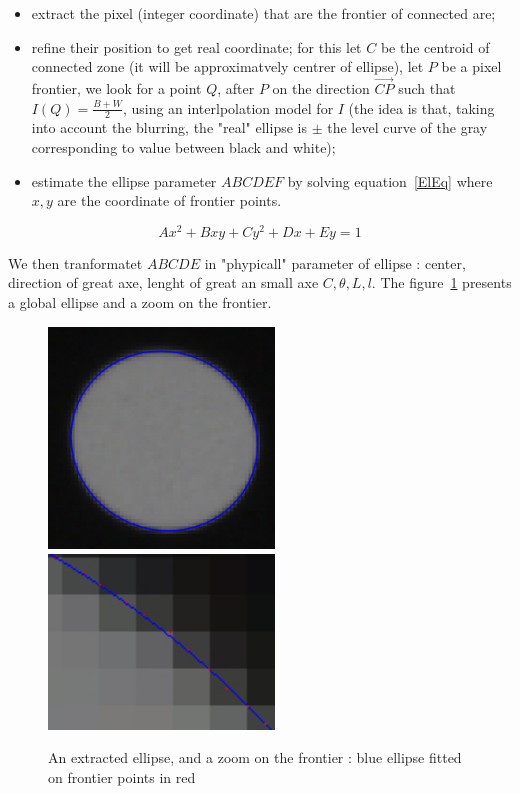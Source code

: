 \begin{itemize}
	\item  extract the pixel (integer coordinate) that are the frontier of
		connected are;

	\item  refine their position to get real coordinate;  for this let $C$ be the
		centroid of connected zone (it will be approximatvely centrer of ellipse), let
		$P$ be a pixel frontier, we look for a point $Q$, after $P$
		on the direction $\overrightarrow{CP}$  such that $I(Q) = \frac{B+W}{2}$,
		using an interlpolation model for $I$ (the idea  is that, taking into account
		the blurring, the "real" ellipse is  $\pm$ the level
		curve of the gray corresponding to value between black and white);

	\item  estimate the ellipse parameter $ABCDEF$ by solving equation~\ref{ElEq}
		where $x,y$ are the coordinate of frontier points.
\end{itemize}

\begin{equation}
	A x^2 + B xy + C y^2 + Dx + E y = 1 \label{ElEq}
\end{equation}


We then tranformatet $ABCDE$ in "phypicall" parameter of ellipse : center, direction of great axe,
lenght of great an small axe  $C,\theta,L,l$.   The figure~\ref{fig:CodeT:Ellipse} presents
a global ellipse and a zoom on the frontier.

\begin{figure}
\centering
	\includegraphics[width=6cm]{Methods/Images/FullEl.jpg}
	\includegraphics[width=6cm]{Methods/Images/ZoomEl.jpg}
	\caption{An extracted ellipse, and a zoom on the frontier : blue ellipse fitted on frontier points in red}
\label{fig:CodeT:Ellipse}
\end{figure}


